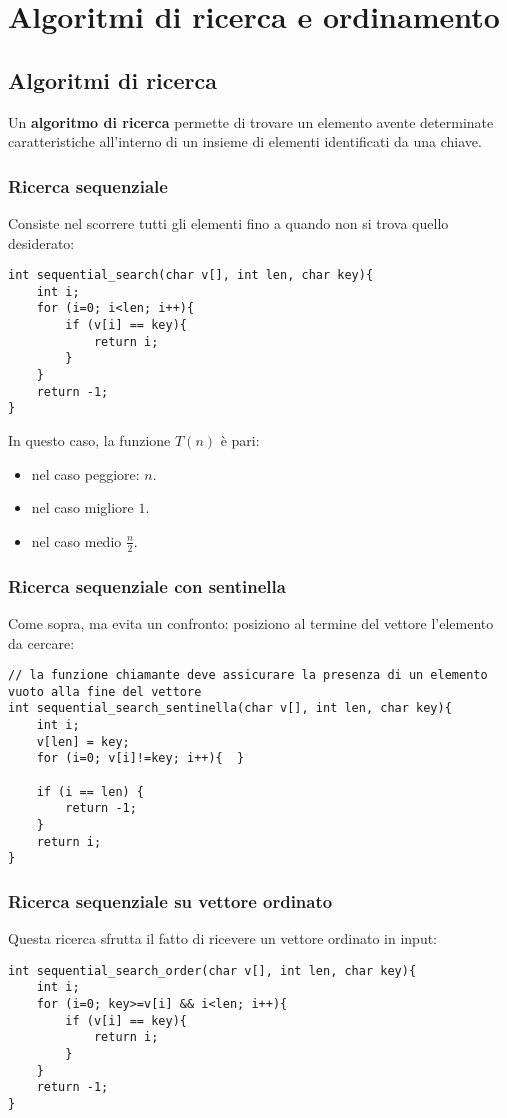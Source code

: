 \chapter{Algoritmi di ricerca e ordinamento}

\section{Algoritmi di ricerca}
Un \textbf{algoritmo di ricerca} permette di trovare un elemento avente determinate caratteristiche all'interno di un insieme di elementi identificati da una chiave.

\subsection{Ricerca sequenziale}
Consiste nel scorrere tutti gli elementi fino a quando non si trova quello desiderato:
\begin{lstlisting}[title={Ricerca sequenziale}]
int sequential_search(char v[], int len, char key){
    int i;
    for (i=0; i<len; i++){
        if (v[i] == key){
            return i;
        }
    }
    return -1;
}
\end{lstlisting}
In questo caso, la funzione $T(n)$ è pari:
\begin{itemize}[noitemsep, nolistsep]
	\item nel caso peggiore: $n$.
	\item nel caso migliore $1$.
	\item nel caso medio $\frac{n}{2}$.
\end{itemize}

\subsection{Ricerca sequenziale con sentinella}
Come sopra, ma evita un confronto: posiziono al termine del vettore l'elemento da cercare:
\begin{lstlisting}[title={Ricerca sequenziale con sentinella}]
// la funzione chiamante deve assicurare la presenza di un elemento vuoto alla fine del vettore
int sequential_search_sentinella(char v[], int len, char key){
    int i;
    v[len] = key;
    for (i=0; v[i]!=key; i++){	}

    if (i == len) {
        return -1;
    }
    return i;
}
\end{lstlisting}

\subsection{Ricerca sequenziale su vettore ordinato}
Questa ricerca sfrutta il fatto di ricevere un vettore ordinato in input:
\begin{lstlisting}[title={Ricerca sequenziale su vettore ordinato}]
int sequential_search_order(char v[], int len, char key){
    int i;
    for (i=0; key>=v[i] && i<len; i++){
        if (v[i] == key){
            return i;
        }
    }
    return -1;
}
\end{lstlisting}


